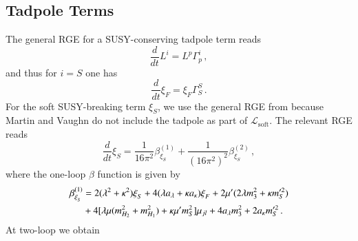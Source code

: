 \documentclass[final,3p,times,pdflatex]{elsarticle}
\newcommand{\lamsq}{\lambda^2}
\newcommand{\kapsq}{\kappa^2}
\newcommand{\dt}{\frac{d}{dt}}
\newcommand{\mhusq}{m^2_{H_2}}
\newcommand{\mhdsq}{m^2_{H_1}}
\newcommand{\mssq}{m_S^2}
\begin{document}
\subsection{Tadpole Terms}
The general RGE for a SUSY-conserving tadpole term reads
%
\begin{equation}
\dt L^i = L^p\Gamma_p^i\,,
\end{equation}
%
and thus for $i=S$ one has
%
\begin{equation}
\dt \xi_F = \xi_F \Gamma_S^S\,.
\end{equation}
%
For the soft SUSY-breaking term $\xi_S$, we use the general RGE from \cite{Yam94} because Martin and Vaughn \cite{MV94} do not include the tadpole as part of $\mathcal{L}_{\mathrm{soft}}$.  The relevant RGE reads
%
\begin{equation}
\dt \xi_S = \frac{1}{16\pi^2} \beta_{\xi_S}^{(1)} + \frac{1}{(16\pi^2)^2} \beta_{\xi_S}^{(2)}\,,
\end{equation}
%
where the one-loop $\beta$ function is given by
%
\begin{align}
\beta_{\xi^{}_S}^{(1)} &= 2(\lamsq + \kapsq)\xi^{}_S + 4(\lambda a_\lambda + \kappa a_\kappa)\xi^{}_F + 2\mu'(2\lambda m_3^2 + \kappa m_S'^2) \notag \\
%
&+ 4[\lambda\mu (\mhusq + \mhdsq) + \kappa\mu' \mssq]\mu_{jl} + 4a_\lambda m_3^2 + 2a_\kappa m_S'^2\,.
\end{align}
%
At two-loop we obtain
%
\end{document}
